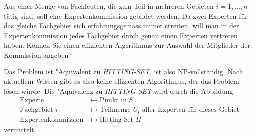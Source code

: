 Aus einer Menge von Fachleuten, die zum Teil in mehreren Gebieten
$i=1,\dots,n$ tätig sind, soll eine Expertenkommission gebildet werden.
Da zwei Experten für das gleiche Fachgebiet sich erfahrungsgemäss
immer streiten, will man in der Expertenkommission jedes Fachgebiet
durch genau einen Experten vertreten haben. Können Sie einen effizienten
Algorithmus zur Auswahl der Mitglieder der Kommission angeben?


\begin{loesung}
Das Problem ist "Aquivalent zu \textsl{HITTING-SET}, ist also
NP-vollständig. Nach aktuellem Wissen gibt es also keine
effizienten Algorithmus, der das Problem lösen würde. Die
"Aquivalenz zu \textsl{HITTING-SET} wird durch die Abbildung
\begin{align*}
\text{Experte}&\mapsto \text{Punkt in $S$}\\
\text{Fachgebiet $i$}&\mapsto \text{Teilmenge $U_i$ aller Experten für dieses Gebiet}\\
\text{Expertenkommission}&\mapsto \text{Hitting Set $H$}
\end{align*}
vermittelt.
\end{loesung}

